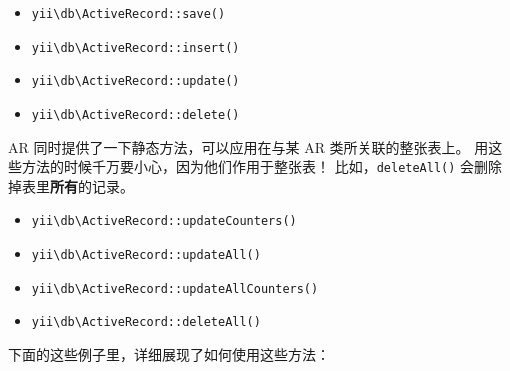 \begin{itemize}
\item \texttt{yii{\allowbreak{}\textbackslash}db{\allowbreak{}\textbackslash}ActiveRecord\allowbreak{}::\allowbreak{}save()}
\item \texttt{yii{\allowbreak{}\textbackslash}db{\allowbreak{}\textbackslash}ActiveRecord\allowbreak{}::\allowbreak{}insert()}
\item \texttt{yii{\allowbreak{}\textbackslash}db{\allowbreak{}\textbackslash}ActiveRecord\allowbreak{}::\allowbreak{}update()}
\item \texttt{yii{\allowbreak{}\textbackslash}db{\allowbreak{}\textbackslash}ActiveRecord\allowbreak{}::\allowbreak{}delete()}
\end{itemize}
AR 同时提供了一下静态方法，可以应用在与某 AR 类所关联的整张表上。
用这些方法的时候千万要小心，因为他们作用于整张表！
比如，\lstinline|deleteAll()|  会删除掉表里\textbf{所有}的记录。

\begin{itemize}
\item \texttt{yii{\allowbreak{}\textbackslash}db{\allowbreak{}\textbackslash}ActiveRecord\allowbreak{}::\allowbreak{}updateCounters()}
\item \texttt{yii{\allowbreak{}\textbackslash}db{\allowbreak{}\textbackslash}ActiveRecord\allowbreak{}::\allowbreak{}updateAll()}
\item \texttt{yii{\allowbreak{}\textbackslash}db{\allowbreak{}\textbackslash}ActiveRecord\allowbreak{}::\allowbreak{}updateAllCounters()}
\item \texttt{yii{\allowbreak{}\textbackslash}db{\allowbreak{}\textbackslash}ActiveRecord\allowbreak{}::\allowbreak{}deleteAll()}
\end{itemize}
下面的这些例子里，详细展现了如何使用这些方法：

